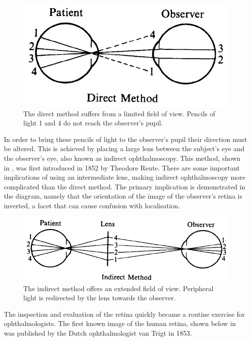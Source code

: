 \begin{figure}[H]
\centering
  \includegraphics{figures/indirect_opthal}
\caption{The direct method suffers from a limited field of view. Pencils of light 1 and 4 do not reach the observer's pupil.\cite{1_eyecalcs.com_2015}}
\label{fig:limited_direct}
\end{figure}


In order to bring these pencils of light to the observer's pupil their direction
must be altered.  This is achieved by placing a large lens between the subject's
eye and the observer's eye, also known as indirect ophthalmoscopy.  This
method, shown in , was first introduced in 1852 by
Theodore Reute.\cite{reutecgt}  There are some important implications of
using an intermediate lens, making indirect ophthalmoscopy more complicated
than the direct method.  The primary implication is demonstrated in the diagram,
namely that the orientation of the image of the observer's retina is inverted, a
facet that can cause confusion with localisation.  

\begin{figure}[H]
\centering
  \includegraphics{figures/indirect_opthal2}
\caption{The indirect method offers an extended field of view.  Peripheral light is redirected by the lens towards the observer.\cite{1_eyecalcs.com_2015}}
\label{fig:indirect_main}
\end{figure}

The inspection and evaluation of the retina quickly became a routine exercise
for ophthalmologists.  The first known image of the human retina, shown below
 in  was published by the Dutch ophthalmologist van Trigt
in 1853.  

